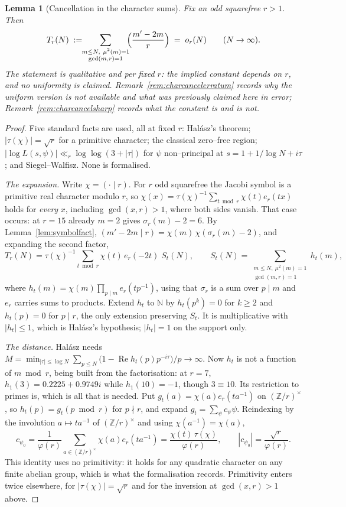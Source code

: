 \documentclass[11pt]{article}
\newtheorem{lemma}[theorem]{Lemma}
\theoremstyle{definition}
\begin{document}
\begin{lemma}[Cancellation in the character sums]\label{lem:charcancel}
Fix an odd squarefree $r>1$. Then
\[ T_r(N)\;:=\!\!\sum_{\substack{m\le N,\ \mu^2(m)=1\\ \gcd(m,r)=1}}\!\!\Bigl(\frac{m'-2m}{r}\Bigr)\;=\;o_r(N)
\qquad (N\to\infty). \]
The statement is qualitative and per fixed $r$: the implied constant depends on $r$, and no
uniformity is claimed. Remark~\ref{rem:charcancelerratum} records why the uniform version is not
available and what was previously claimed here in error; Remark~\ref{rem:charcancelsharp}
records what the constant is and is not.
\end{lemma}
\begin{proof}
Five standard facts are used, all at fixed $r$: Hal\'asz's theorem; $|\tau(\chi)|=\sqrt r$ for a
primitive character; the classical zero--free region; $|\log L(s,\psi)|\ll_r\log\log(3+|\tau|)$ for
$\psi$ non--principal at $s=1+1/\log N+i\tau$; and Siegel--Walfisz. None is formalised.

\emph{The expansion.} Write $\chi=(\cdot\mid r)$. For $r$ odd squarefree the Jacobi symbol is a
primitive real character modulo $r$, so
$\chi(x)=\tau(\chi)^{-1}\sum_{t\bmod r}\chi(t)e_r(tx)$ holds for \emph{every} $x$, including
$\gcd(x,r)>1$, where both sides vanish. That case occurs: at $r=15$ already $m=2$ gives
$\sigma_r(m)-2=6$. By Lemma~\ref{lem:symbolfact},
$(m'-2m\mid r)=\chi(m)\,\chi(\sigma_r(m)-2)$, and expanding the second factor,
\[ T_r(N)=\tau(\chi)^{-1}\sum_{t\bmod r}\chi(t)\,e_r(-2t)\;S_t(N),\qquad
   S_t(N)=\!\!\sum_{\substack{m\le N,\ \mu^2(m)=1\\ \gcd(m,r)=1}}\!\!h_t(m), \]
where $h_t(m)=\chi(m)\prod_{p\mid m}e_r(tp^{-1})$, using that $\sigma_r$ is a sum over $p\mid m$ and
$e_r$ carries sums to products. Extend $h_t$ to $\mathbb{N}$ by $h_t(p^k)=0$ for $k\ge2$ and
$h_t(p)=0$ for $p\mid r$, the only extension preserving $S_t$. It is multiplicative with
$|h_t|\le1$, which is Hal\'asz's hypothesis; $|h_t|=1$ on the support only.

\emph{The distance.} Hal\'asz needs
$M=\min_{|\tau|\le\log N}\sum_{p\le N}\bigl(1-\operatorname{Re}h_t(p)p^{-i\tau}\bigr)/p\to\infty$.
Now $h_t$ is not a function of $m\bmod r$, being built from the factorisation: at $r=7$,
$h_1(3)=0.2225+0.9749i$ while $h_1(10)=-1$, though $3\equiv10$. Its restriction to primes is,
which is all that is needed. Put $g_t(a)=\chi(a)e_r(ta^{-1})$ on $(\mathbb{Z}/r)^\times$, so
$h_t(p)=g_t(p\bmod r)$ for $p\nmid r$, and expand $g_t=\sum_\psi c_\psi\psi$. Reindexing by the
involution $a\mapsto ta^{-1}$ of $(\mathbb{Z}/r)^\times$ and using $\chi(a^{-1})=\chi(a)$,
\[ c_{\psi_0}=\frac1{\varphi(r)}\sum_{a\in(\mathbb{Z}/r)^\times}\chi(a)e_r(ta^{-1})
   =\frac{\chi(t)\,\tau(\chi)}{\varphi(r)},\qquad |c_{\psi_0}|=\frac{\sqrt r}{\varphi(r)}. \]
This identity uses no primitivity: it holds for any quadratic character on any finite abelian group,
which is what the formalisation records. Primitivity enters twice elsewhere, for
$|\tau(\chi)|=\sqrt r$ and for the inversion at $\gcd(x,r)>1$ above.


\end{proof}
\end{document}
